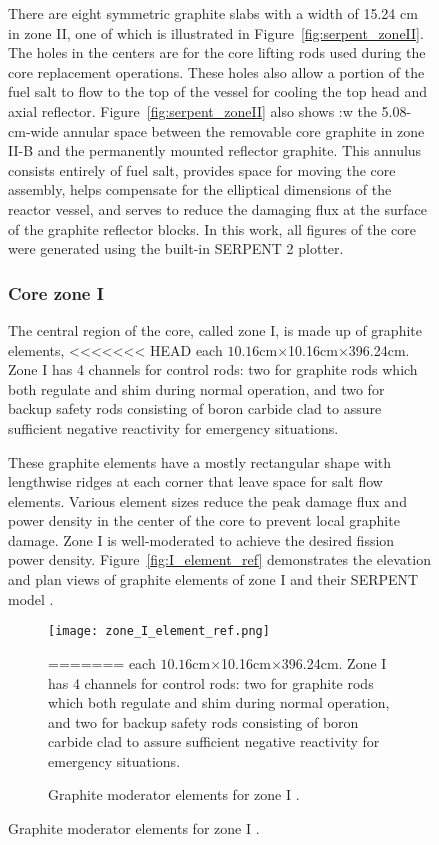 \begin{figure}[t!]
There are eight symmetric graphite slabs with a width of 15.24 cm in zone II, 
one of which is illustrated in Figure~\ref{fig:serpent_zoneII}. The holes in 
the centers are for the core lifting rods used during the core replacement 
operations. These holes also allow a portion of the fuel salt to flow to the 
top of the vessel for cooling the top head and axial reflector. 
Figure~\ref{fig:serpent_zoneII} also shows :w
the 5.08-cm-wide annular 
space between the removable core graphite in zone II-B and the permanently 
mounted reflector graphite. This annulus consists entirely of fuel salt, 
provides space for moving the core assembly, helps compensate for the elliptical 
dimensions of the reactor vessel, and serves to reduce the damaging flux at the 
surface of the graphite reflector blocks. In this work, all figures of the core 
were generated using the built-in SERPENT 2 plotter. 


\subsubsection{Core zone I}
The central region of the core, called zone I, is made up of graphite elements, 
<<<<<<< HEAD
each $10.16$cm$\times$10.16cm$\times$396.24cm. Zone I has 4 channels for control 
rods: two for graphite rods which both regulate and shim during normal 
operation, and two for backup safety rods consisting of boron carbide clad to 
assure sufficient negative reactivity for emergency situations.

These graphite elements have a mostly rectangular shape with lengthwise ridges 
at each corner that leave space for salt flow elements. Various element sizes 
reduce the peak damage flux and power density in the center of the core to 
prevent local graphite damage. Zone I is well-moderated to achieve the desired 
fission power density. Figure~\ref{fig:I_element_ref} demonstrates the elevation 
and plan views of graphite elements of zone I \cite{robertson_conceptual_1971} 
and their SERPENT model \cite{rykhlevskii_full-core_2017}.
\begin{figure}[ht!] %
  \centering
  \texttt{[image: zone\_I\_element\_ref.png]}
  \caption{Graphite moderator elements for zone I 
\cite{robertson_conceptual_1971,rykhlevskii_full-core_2017}.}
=======
each $10.16$cm$\times$10.16cm$\times$396.24cm. Zone I has 4 channels for 
control rods: two for graphite rods which both regulate and shim during normal 
operation, and two for backup safety rods consisting of boron carbide clad to 
assure sufficient negative reactivity for emergency situations.


\end{figure}
\end{figure}

